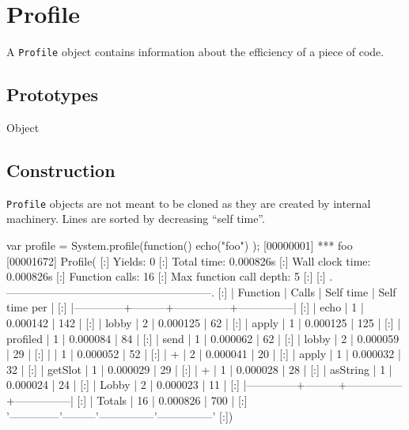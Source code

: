 
\section{Profile}

A \lstinline|Profile| object contains information about the efficiency of a
piece of code.

\subsection{Prototypes}

\begin{refObjects}
\item[Object]
\end{refObjects}

\subsection{Construction}

\lstinline|Profile| objects are not meant to be cloned as they are created
by  internal machinery. Lines are sorted by
decreasing ``self time''.

\begin{urbiscript}
var profile = System.profile(function() { echo("foo") });
[00000001] *** foo
[00001672] Profile(
[:]  Yields: 0
[:]  Total time: 0.000826s
[:]  Wall clock time: 0.000826s
[:]  Function calls: 16
[:]  Max function call depth: 5
[:]
[:]  .--------------------------------------------------------.
[:]  |   Function   |  Calls  |   Self time   | Self time per |
[:]  |--------------+---------+---------------+---------------|
[:]  |         echo |       1 |      0.000142 |           142 |
[:]  |        lobby |       2 |      0.000125 |            62 |
[:]  |        apply |       1 |      0.000125 |           125 |
[:]  |     profiled |       1 |      0.000084 |            84 |
[:]  |         send |       1 |      0.000062 |            62 |
[:]  |        lobby |       2 |      0.000059 |            29 |
[:]  |              |       1 |      0.000052 |            52 |
[:]  |            + |       2 |      0.000041 |            20 |
[:]  |        apply |       1 |      0.000032 |            32 |
[:]  |      getSlot |       1 |      0.000029 |            29 |
[:]  |            + |       1 |      0.000028 |            28 |
[:]  |     asString |       1 |      0.000024 |            24 |
[:]  |        Lobby |       2 |      0.000023 |            11 |
[:]  |--------------+---------+---------------+---------------|
[:]  |       Totals |      16 |      0.000826 |           700 |
[:]  '--------------'---------'---------------'---------------'
[:])
\end{urbiscript}

